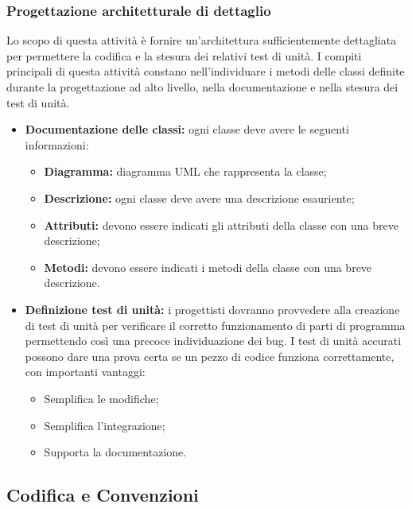 \subsubsection{Progettazione architetturale di dettaglio}
Lo scopo di questa attività è fornire un'architettura sufficientemente dettagliata per permettere la codifica e la stesura dei relativi test di unità. I compiti principali di questa attività constano nell'individuare i metodi delle classi definite durante la progettazione ad alto livello, nella documentazione e nella stesura dei test di unità.
	\begin{itemize}
		\item \textbf{Documentazione delle classi: }ogni classe deve avere le seguenti informazioni:
			\begin{itemize}
				\item \textbf{Diagramma: }diagramma UML che rappresenta la classe;
				\item \textbf{Descrizione: }ogni classe deve avere una descrizione esauriente;
				\item \textbf{Attributi: }devono essere indicati gli attributi della classe con una breve descrizione;
				\item \textbf{Metodi: }devono essere indicati i metodi della classe con una breve descrizione.
			\end{itemize}
		\item \textbf{Definizione test di unità: } i progettisti dovranno provvedere alla creazione di test di unità per verificare il corretto funzionamento di parti di programma permettendo così una precoce individuazione dei bug. I test di unità accurati possono dare una prova certa se un pezzo di codice funziona correttamente, con importanti vantaggi:
			\begin{itemize}
				\item Semplifica le modifiche;
				\item Semplifica l'integrazione;
				\item Supporta la documentazione.
			\end{itemize}
	\end{itemize}

\subsection{Codifica e Convenzioni}



